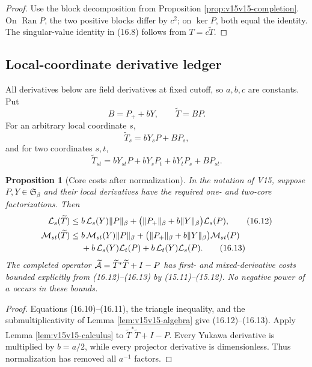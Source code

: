 \documentclass[11pt]{article}
\newtheorem{proposition}[theorem]{Proposition}
\theoremstyle{remark}
\begin{document}
\begin{proof}
Use the block decomposition from Proposition
\ref{prop:v15v15-completion}.  On \(\operatorname{Ran}P\), the two
positive blocks differ by \(c^2\); on \(\ker P\), both equal the
identity.  The singular-value identity in (16.8) follows from
\(T=c\widetilde T\).
\end{proof}

\subsection{Local-coordinate derivative ledger}

All derivatives below are field derivatives at fixed cutoff, so
\(a,b,c\) are constants.  Put
\[
 B=P_++bY,\qquad \widetilde T=BP.                           \tag{16.9}
\]
For an arbitrary local coordinate \(s\),
\[
 \widetilde T_s=bY_sP+BP_s,                                \tag{16.10}
\]
and for two coordinates \(s,t\),
\[
 \widetilde T_{st}
 =bY_{st}P+bY_sP_t+bY_tP_s+BP_{st}.                        \tag{16.11}
\]

\begin{proposition}[Core costs after normalization]
\label{prop:v15v16-costs}
In the notation of V15, suppose \(P,Y\in\mathfrak S_\beta\) and
their local derivatives have the required one- and two-core
factorizations.  Then
\[
\begin{aligned}
 {\cal L}_s(\widetilde T)
 \le{}&
 b\,{\cal L}_s(Y)\|P\|_\beta+
 \bigl(\|P_+\|_\beta+b\|Y\|_\beta\bigr){\cal L}_s(P),       \tag{16.12}\\
 {\cal M}_{st}(\widetilde T)
 \le{}&
 b\,{\cal M}_{st}(Y)\|P\|_\beta+
 \bigl(\|P_+\|_\beta+b\|Y\|_\beta\bigr)
       {\cal M}_{st}(P)\\
 &+b\,{\cal L}_s(Y){\cal L}_t(P)
  +b\,{\cal L}_t(Y){\cal L}_s(P).                          \tag{16.13}
\end{aligned}
\]
The completed operator
\(\widetilde{\cal A}=\widetilde T^*\widetilde T+I-P\)
has first- and mixed-derivative costs bounded explicitly from
(16.12)--(16.13) by (15.11)--(15.12).  No negative power of \(a\)
occurs in these bounds.
\end{proposition}

\begin{proof}
Equations (16.10)--(16.11), the triangle inequality, and the
submultiplicativity of Lemma \ref{lem:v15v15-algebra} give
(16.12)--(16.13).  Apply Lemma
\ref{lem:v15v15-calculus} to
\(\widetilde T^*\widetilde T+I-P\).  Every Yukawa derivative is
multiplied by \(b=a/2\), while every projector derivative is
dimensionless.  Thus normalization has removed all \(a^{-1}\)
factors.
\end{proof}
\end{document}
